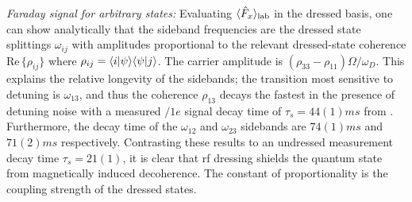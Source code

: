 \documentclass[aps,prl,reprint,superscriptaddress,floatfix]{revtex4-1}
\begin{document}
\textit{Faraday signal for arbitrary states:}
Evaluating $\langle \hat{F}_x \rangle_{\text{lab}}$ in the dressed basis, one can show analytically that the sideband frequencies are the dressed state splittings $\omega_{ij}$ with amplitudes proportional to the relevant dressed-state coherence $\text{Re}\,\{\rho_{ij}\}$ where $\rho_{ij} = \langle i \vert \psi \rangle \langle \psi \vert j \rangle $.
The carrier amplitude is $(\rho_{33} - \rho_{11}) \Omega / \omega_D$.
This explains the relative longevity of the sidebands; the transition most sensitive to detuning is $\omega_{13}$, and thus the coherence $\rho_{13}$ decays the fastest in the presence of detuning noise with a measured $/1e$ signal decay time of $\tau_{s}=44(1)\unit{ms}$ from . 
Furthermore, the decay time of the $\omega_{12}$ and $\omega_{23}$ sidebands are $74(1)\unit{ms}$ and $71(2)\unit{ms}$ respectively. 
Contrasting these results to an undressed measurement decay time $\tau_{s}=21(1)$, it is clear that rf dressing shields the quantum state from magnetically induced decoherence.
The constant of proportionality is the coupling strength of the dressed states.
\end{document}
